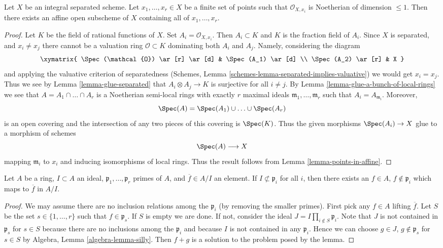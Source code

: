 \begin{lemma}
\label{lemma-finite-set-codim-1-points-in-affine}
Let $X$ be an integral separated scheme. Let $x_1, \ldots, x_r \in X$
be a finite set of points such that $\mathcal{O}_{X, x_i}$
is Noetherian of dimension $\leq 1$. Then there exists an affine
open subscheme of $X$ containing all of $x_1, \ldots, x_r$.
\end{lemma}

\begin{proof}
Let $K$ be the field of rational functions of $X$.
Set $A_i = \mathcal{O}_{X, x_i}$. Then $A_i \subset K$ and $K$
is the fraction field of $A_i$. Since $X$ is separated, and
$x_i \not = x_j$ there cannot be a valuation ring $\mathcal{O} \subset K$
dominating both $A_i$ and $A_j$. Namely, considering the
diagram
$$
\xymatrix{
\Spec(\mathcal{O}) \ar[r] \ar[d] & \Spec(A_1) \ar[d] \\
\Spec(A_2) \ar[r] & X
}
$$
and applying the valuative criterion of separatedness
(Schemes, Lemma \ref{schemes-lemma-separated-implies-valuative})
we would get $x_i = x_j$. Thus we see by
Lemma \ref{lemma-glue-separated}
that $A_i \otimes A_j \to K$ is surjective for all $i \not = j$.
By Lemma \ref{lemma-glue-a-bunch-of-local-rings}
we see that $A = A_1 \cap \ldots \cap A_r$ is a Noetherian
semi-local rings with exactly $r$ maximal ideals
$\mathfrak m_1, \ldots, \mathfrak m_r$ such that $A_i = A_{\mathfrak m_i}$.
Moreover,
$$
\Spec(A) = \Spec(A_1) \cup \ldots \cup \Spec(A_r)
$$
is an open covering and the intersection of any two pieces of this
covering is $\Spec(K)$. Thus the given morphisms $\Spec(A_i) \to X$
glue to a morphism of schemes
$$
\Spec(A) \longrightarrow X
$$
mapping $\mathfrak m_i$ to $x_i$ and inducing isomorphisms of local rings.
Thus the result follows from Lemma \ref{lemma-points-in-affine}.
\end{proof}

\begin{lemma}
\label{lemma-extra-silly}
Let $A$ be a ring, $I \subset A$ an ideal,
$\mathfrak p_1, \ldots, \mathfrak p_r$ primes of $A$, and
$\overline{f} \in A/I$ an element. If $I \not \subset \mathfrak p_i$
for all $i$, then there exists an $f \in A$, $f \not \in \mathfrak p_i$
which maps to $\overline{f}$ in $A/I$.
\end{lemma}

\begin{proof}
We may assume there are no inclusion relations among the $\mathfrak p_i$
(by removing the smaller primes). First pick any $f \in A$ lifting
$\overline{f}$. Let $S$ be the set $s \in \{1, \ldots, r\}$ such
that $f \in \mathfrak p_s$. If $S$ is empty we are done. If not,
consider the ideal $J = I \prod_{i \not \in S} \mathfrak p_i$.
Note that $J$ is not contained in $\mathfrak p_s$ for $s \in S$
because there are no inclusions among the $\mathfrak p_i$ and because
$I$ is not contained in any $\mathfrak p_i$.
Hence we can choose $g \in J$, $g \not \in \mathfrak p_s$ for
$s \in S$ by Algebra, Lemma \ref{algebra-lemma-silly}.
Then $f + g$ is a solution to the problem posed by the lemma.
\end{proof}


